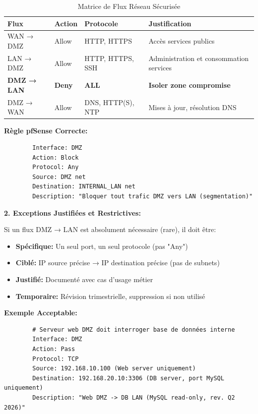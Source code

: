 \documentclass[12pt,a4paper,openany]{report}
\begin{document}
	\begin{table}[H]
		\centering
		\small
		\renewcommand{\arraystretch}{1.3}
		\begin{tabular}{p{3cm} p{3cm} p{3cm} p{3.5cm}}
			\hline
			\textbf{Flux} & \textbf{Action} & \textbf{Protocole} & \textbf{Justification} \\
			\hline
			WAN → DMZ & Allow & HTTP, HTTPS & Accès services publics \\
			
			LAN → DMZ & Allow & HTTP, HTTPS, SSH & Administration et consommation services \\
			
			\textbf{DMZ → LAN} & \textbf{Deny} & \textbf{ALL} & 
			\textbf{Isoler zone compromise} \\
			
			DMZ → WAN & Allow & DNS, HTTP(S), NTP & Mises à jour, résolution DNS \\
			\hline
		\end{tabular}
		\caption{Matrice de Flux Réseau Sécurisée}
	\end{table}
	
	\textbf{Règle pfSense Correcte:}
	
	\begin{lstlisting}
		Interface: DMZ
		Action: Block
		Protocol: Any
		Source: DMZ net
		Destination: INTERNAL_LAN net
		Description: "Bloquer tout trafic DMZ vers LAN (segmentation)"
	\end{lstlisting}
	
	\textbf{2. Exceptions Justifiées et Restrictives:}
	
	Si un flux DMZ → LAN est absolument nécessaire (rare), il doit être:
	
	\begin{itemize}
		\item \textbf{Spécifique:} Un seul port, un seul protocole (pas "Any")
		\item \textbf{Ciblé:} IP source précise → IP destination précise (pas de subnets)
		\item \textbf{Justifié:} Documenté avec cas d'usage métier
		\item \textbf{Temporaire:} Révision trimestrielle, suppression si non utilisé
	\end{itemize}
	
	\textbf{Exemple Acceptable:}
	
	\begin{lstlisting}
		# Serveur web DMZ doit interroger base de données interne
		Interface: DMZ
		Action: Pass
		Protocol: TCP
		Source: 192.168.10.100 (Web server uniquement)
		Destination: 192.168.20.10:3306 (DB server, port MySQL uniquement)
		Description: "Web DMZ -> DB LAN (MySQL read-only, rev. Q2 2026)"
	\end{lstlisting}
	
\end{document}
